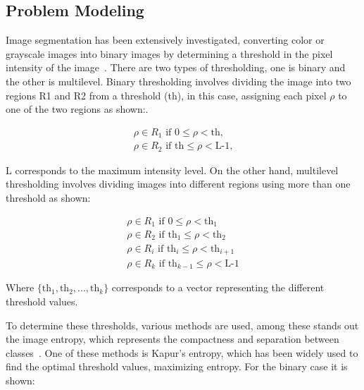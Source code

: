 \documentclass{elsarticle}
\begin{document}
\subsection{Problem Modeling}

\noindent Image segmentation has been extensively investigated, converting color or grayscale images into binary images by determining a threshold in the pixel intensity of the image~\cite{Sankur2004}. There are two types of thresholding, one is binary and the other is multilevel. Binary thresholding involves dividing the image into two regions R1 and R2 from a threshold (th), in this case, assigning each pixel $\rho$ to one of the two regions as shown:.

\begin{equation}
\begin{gathered}
\rho \in R_1 \text{ if } 0 \leq \rho < \text{th,} \\
\rho \in R_2 \text{ if } \text{th} \leq \rho < \text{L-1,}
\end{gathered}
\label{eq1}
\end{equation}

\noindent L corresponds to the maximum intensity level.
On the other hand, multilevel thresholding involves dividing images into different regions using more than one threshold as shown:

\begin{equation}
\begin{gathered}
\rho \in R_1 \text{ if } 0 \leq \rho < \text{th}_1 \\
\rho \in R_2 \text{ if } \text{th}_1 \leq \rho < \text{th}_2 \\
\rho \in R_i \text{ if } \text{th}_i \leq \rho < \text{th}_{i+1} \\
\rho \in R_k \text{ if } \text{th}_{k-1} \leq \rho < \text{L-1}
\end{gathered}
\label{eq2}
\end{equation}

\noindent Where $\{\text{th}_1,\text{th}_2,...,\text{th}_k\}$ corresponds to a vector representing the different threshold values.

\noindent To determine these thresholds, various methods are used, among these stands out the image entropy, which represents the compactness and separation between classes~\cite{Pun1980}. One of these methods is Kapur's entropy, which has been widely used to find the optimal threshold values, maximizing entropy. For the binary case it is shown:
\end{document}

